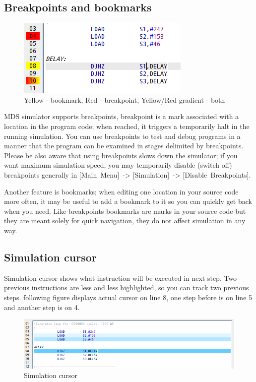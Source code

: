     \subsection{Breakpoints and bookmarks}
        \begin{figure}
            \centering
                \includegraphics[width=.35\textwidth]{img/breakpoints1.png}
                \caption{Yellow - bookmark, Red - breakpoint, Yellow/Red gradient - both}
        \end{figure}
        MDS simulator supports breakpoints, breakpoint is a mark associated with a location in the program code; when
        reached, it triggers a temporarily halt in the running simulation. You can use breakpoints to test and debug
        programs in a manner that the program can be examined in stages delimited by breakpoints. Please be also aware
        that using breakpoints slows down the simulator; if you want maximum simulation speed, you may temporarily
        disable (switch off) breakpoints generally in [Main~Menu]~-> [Simulation]~-> [Disable~Breakpoints].

        Another feature is bookmarks; when editing one location in your source code more often, it may be useful to add
        a bookmark to it so you can quickly get back when you need. Like breakpoints bookmarks are marks in your source
        code but they are meant solely for quick navigation, they do not affect simulation in any way.

    \subsection{Simulation cursor}
        Simulation cursor shows what instruction will be executed in next step. Two previous instructions are less and
        less highlighted, so you can track two previous steps. following figure displays actual cursor on line 8, one
        step before is on line 5 and another step is on 4.
        \begin{figure}[h!]
            \centering
            \includegraphics[width=\textwidth]{img/simulationcursor1.png}
            \caption{Simulation cursor}
        \end{figure}

